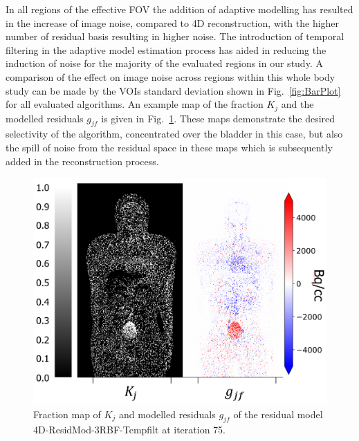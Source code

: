 In all regions of the effective FOV the addition of adaptive modelling has resulted in the increase of image noise, compared to 4D reconstruction, with the higher number of residual basis resulting in higher noise. The introduction of temporal filtering in the adaptive model estimation process has aided in reducing the induction of noise for the majority of the evaluated regions in our study. 
A comparison of the effect on image noise across regions within this whole body study can be made by the VOIs standard deviation shown in Fig.~\ref{fig:BarPlot} for all evaluated algorithms.
An example map of the fraction $K_{j}$ and the modelled residuals $g_{jf}$ is given in Fig.~\ref{fig:FractionMap}. These maps demonstrate the desired selectivity of the algorithm, concentrated over the bladder in this case, but also the
spill of noise from the residual space in these maps which is subsequently added in the reconstruction process.

\begin{figure} [h!]
\centering
\includegraphics[scale=0.44 ,angle=0]{3_Results/3_4_Residual/figures/FractionMap.png}
\caption{Fraction map of $K_j$ and modelled residuals $g_{jf}$ of the residual model 4D-ResidMod-3RBF-Tempfilt at iteration 75.} 
\label{fig:FractionMap}
\end{figure}

